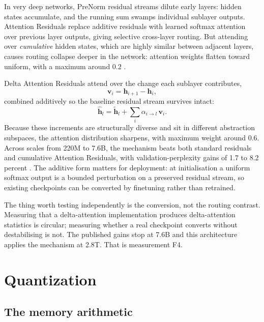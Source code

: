 \documentclass[11pt]{article}
\begin{document}
In very deep networks, PreNorm residual streams dilute early layers: hidden states accumulate, and the running sum swamps individual sublayer outputs. Attention Residuals \cite{kimi2026attnres} replace additive residuals with learned softmax attention over previous layer outputs, giving selective cross-layer routing. But attending over \emph{cumulative} hidden states, which are highly similar between adjacent layers, causes routing collapse deeper in the network: attention weights flatten toward uniform, with a maximum around 0.2 \cite{luo2026deltares}.

Delta Attention Residuals \cite{luo2026deltares} attend over the change each sublayer contributes,
\begin{equation}
\mathbf{v}_i = \mathbf{h}_{i+1} - \mathbf{h}_i ,
\label{eq:delta}
\end{equation}
combined additively so the baseline residual stream survives intact:
\begin{equation}
\hat{\mathbf{h}}_l = \tilde{\mathbf{h}}_l + \sum_i \alpha_{i\rightarrow l}\, \mathbf{v}_i .
\label{eq:deltares}
\end{equation}
Because these increments are structurally diverse and sit in different abstraction subspaces, the attention distribution sharpens, with maximum weight around 0.6. Across scales from 220M to 7.6B, the mechanism beats both standard residuals and cumulative Attention Residuals, with validation-perplexity gains of 1.7 to 8.2 percent \cite{luo2026deltares}. The additive form matters for deployment: at initialisation a uniform softmax output is a bounded perturbation on a preserved residual stream, so existing checkpoints can be converted by finetuning rather than retrained.

The thing worth testing independently is the conversion, not the routing contrast. Measuring that a delta-attention implementation produces delta-attention statistics is circular; measuring whether a real checkpoint converts without destabilising is not. The published gains stop at 7.6B and this architecture applies the mechanism at 2.8T. That is measurement F4.

\section{Quantization}
\label{sec:quant}

\subsection{The memory arithmetic}
\label{sec:memory}
\end{document}
